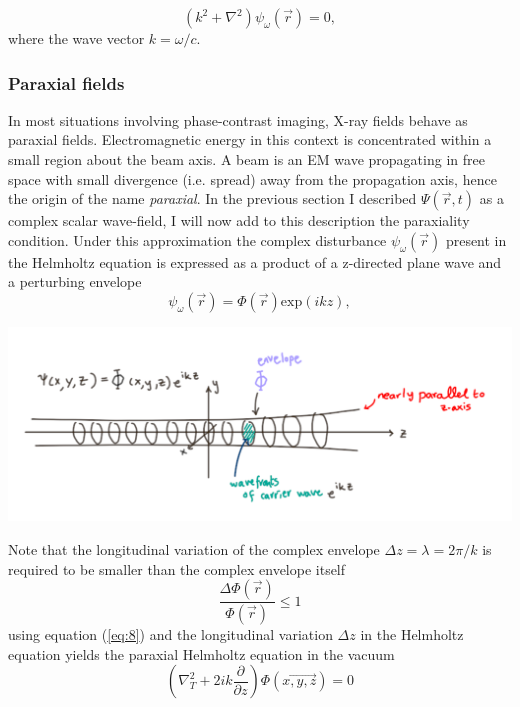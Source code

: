 \documentclass[9pt, a4paper]{article}
\newenvironment{Figure}
    {\par\medskip\noindent\minipage{\linewidth}}
    {\endminipage\par\medskip}
\begin{document}
\begin{equation}\label{eq:6}
\left ( k^2 + \nabla^{2} \right ) \psi_{\omega}(\vec{r})  
 = 0,
\end{equation}
where the wave vector $k = \omega/c$.

\subsubsection{Paraxial fields}
In most situations involving phase-contrast imaging, X-ray fields behave as paraxial fields. Electromagnetic energy in this context is concentrated within a small region about the beam axis. A beam is an EM wave propagating in free space with small divergence (i.e. spread) away from the propagation axis, hence the origin of the name \textit{paraxial}.
In the previous section I described $\Psi(\vec{r},t)$ as a complex scalar wave-field, I will now add to this description the paraxiality condition.
Under this approximation the complex disturbance $\psi_{\omega}(\vec{r})$ present in the Helmholtz equation is expressed as a product of a z-directed plane wave and a perturbing envelope\cite{PagsTutes}\cite{CH49}
\begin{equation}\label{eq:7}
\psi_{\omega}(\vec{r}) = \Phi(\vec{r})\mathrm{exp}(ikz),
\end{equation}
\begin{Figure}
\centering
\includegraphics[width=0.6\linewidth]{paraxial_beam.pdf}
\end{Figure}
Note that the longitudinal variation of the complex envelope $\Delta z = \lambda = 2 \pi/k$ is required to be smaller than the complex envelope itself
\begin{equation}\label{eq:8}
\frac{\Delta \Phi(\vec{r})}{\Phi(\vec{r})} \leq 1
\end{equation}
using equation (\ref{eq:8}) and the longitudinal variation $\Delta z$  in the Helmholtz equation yields the paraxial Helmholtz equation in the vacuum
\begin{equation}\label{eq:9}
\left (\nabla_{T}^{2} + 2 i k \frac{\partial }{\partial z}\right ) \Phi(\vec{x , y, z}) = 0
\end{equation}
\end{document}
